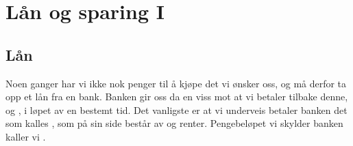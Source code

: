 \section{Lån og sparing I}
\subsection{Lån}
Noen ganger har vi  ikke nok penger til å kjøpe det vi ønsker oss, og må derfor ta opp et lån fra en bank. Banken gir oss da en viss  mot at vi betaler tilbake denne, og , i løpet av en bestemt tid. Det vanligste er at vi underveis betaler banken det som kalles , som på sin side består av  og renter. Pengebeløpet vi skylder banken kaller vi . \vsk

